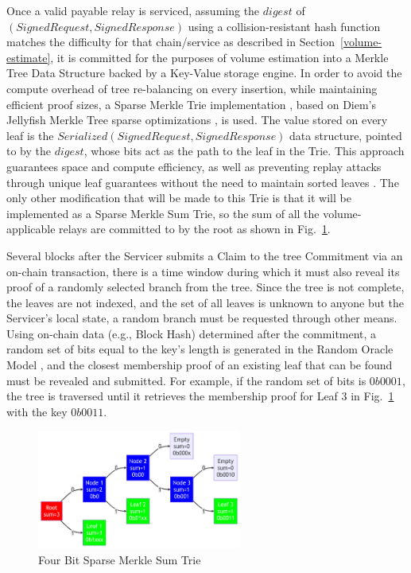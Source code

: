 \documentclass[runningheads]{llncs}
\begin{document}
Once a valid payable relay is serviced, assuming the $digest$ of $(SignedRequest, SignedResponse)$ using a collision-resistant hash function matches the difficulty for that chain/service as described in Section~\ref{volume-estimate}, it is committed for the purposes of volume estimation into a Merkle Tree Data Structure backed by a Key-Value storage engine. In order to avoid the compute overhead of tree re-balancing on every insertion, while maintaining efficient proof sizes, a Sparse Merkle Trie implementation \cite{diem2021jmt}, based on Diem's Jellyfish Merkle Tree sparse optimizations \cite{smt-github}, is used. The value stored on every leaf is the $Serialized(SignedRequest, SignedResponse)$ data structure, pointed to by the $digest$, whose bits act as the path to the leaf in the Trie. This approach guarantees space and compute efficiency, as well as preventing replay attacks through unique leaf guarantees without the need to maintain sorted leaves \cite{alin2023sortedleaves}. The only other modification that will be made to this Trie is that it will be implemented as a Sparse Merkle Sum Trie, so the sum of all the volume-applicable relays are committed to by the root \cite{plasma2019mst} as shown in Fig.~\ref{fig:smt}.

Several blocks after the Servicer submits a Claim to the tree Commitment via an on-chain transaction, there is a time window during which it must also reveal its proof of a randomly selected branch from the tree. Since the tree is not complete, the leaves are not indexed, and the set of all leaves is unknown to anyone but the Servicer's local state, a random branch must be requested through other means. Using on-chain data (e.g., Block Hash) determined after the commitment, a random set of bits equal to the key's length is generated in the Random Oracle Model \cite{randomoracle1993}, and the closest membership proof of an existing leaf that can be found must be revealed and submitted. For example, if the random set of bits is $0b0001$, the tree is traversed until it retrieves the membership proof for Leaf 3 in Fig.~\ref{fig:smt} with the key $0b0011$.

\begin{figure}
    \centering
    \includegraphics[width=0.6\textwidth]{smt.png}
    \caption{Four Bit Sparse Merkle Sum Trie} \label{fig:smt}
\end{figure}
\end{document}
